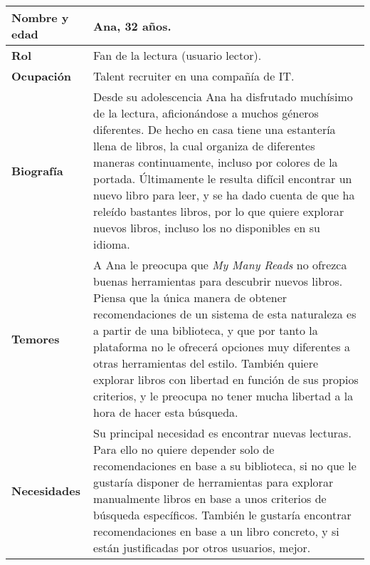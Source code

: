 \begin{table}[H]
    \centering
    \begin{tabularx}{\columnwidth}{|l|X|}
        \hline
        \textbf{Nombre y edad} & Ana, 32 años. \\
        \hline
        \textbf{Rol} & Fan de la lectura (usuario lector). \\
        \hline
        \textbf{Ocupación} & Talent recruiter en una compañía de IT. \\
        \hline
        \textbf{Biografía} & Desde su adolescencia Ana ha disfrutado muchísimo de la lectura, aficionándose a muchos géneros diferentes. De hecho en casa tiene una estantería llena de libros, la cual organiza de diferentes maneras continuamente, incluso por colores de la portada. Últimamente le resulta difícil encontrar un nuevo libro para leer, y se ha dado cuenta de que ha releído bastantes libros, por lo que quiere explorar nuevos libros, incluso los no disponibles en su idioma. \\
        \hline
        \textbf{Temores} & A Ana le preocupa que \textit{My Many Reads} no ofrezca buenas herramientas para descubrir nuevos libros. Piensa que la única manera de obtener recomendaciones de un sistema de esta naturaleza es a partir de una biblioteca, y que por tanto la plataforma no le ofrecerá opciones muy diferentes a otras herramientas del estilo. También quiere explorar libros con libertad en función de sus propios criterios, y le preocupa no tener mucha libertad a la hora de hacer esta búsqueda. \\
        \hline
        \textbf{Necesidades} & Su principal necesidad es encontrar nuevas lecturas. Para ello no quiere depender solo de recomendaciones en base a su biblioteca, si no que le gustaría disponer de herramientas para explorar manualmente libros en base a unos criterios de búsqueda específicos. También le gustaría encontrar recomendaciones en base a un libro concreto, y si están justificadas por otros usuarios, mejor. \\
        \hline
    \end{tabularx}
\end{table}

